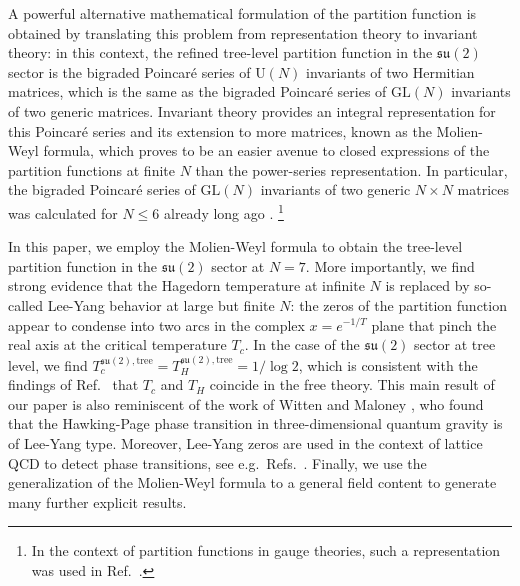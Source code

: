 \documentclass[a4paper,11pt]{article}
\begin{document}
A powerful alternative mathematical formulation of the partition function is obtained by translating this problem from representation theory to invariant theory: in this context, the refined tree-level partition function in the $\mathfrak{su}(2)$ sector is the bigraded Poincar\'e series of $\text{U}(N)$ invariants of two Hermitian matrices, which is the same as the bigraded Poincar\'e series of $\text{GL}(N)$ invariants of two generic matrices.
% 
Invariant theory provides an integral representation for this Poincar\'e series and its extension to more matrices, known as the Molien-Weyl formula, which proves to be an easier avenue to closed expressions of the partition functions at finite $N$ than the power-series representation.
In particular, the bigraded Poincar\'e series of $\text{GL}(N)$ invariants of two generic $N\times N$ matrices was calculated for $N\leq 6$ already long ago \cite{FORMANEK1981105,teranishi1986,teranishi1987,dhokovic2007}.%
\footnote{In the context of partition functions in gauge theories, such a representation was used in Ref.\ \cite{Dolan:2007rq}.}





In this paper, we employ the Molien-Weyl formula to obtain the tree-level partition function in the $\mathfrak{su}(2)$ sector at $N=7$.
More importantly, we find strong evidence that the Hagedorn temperature at infinite $N$ is replaced by so-called Lee-Yang behavior \cite{Yang:1952be} at large but finite $N$: the zeros of the partition function appear to condense into two arcs in the complex $x=e^{-1/T}$ plane that pinch the real axis at the critical temperature $T_c$. In the case of the $\mathfrak{su}(2)$ sector at tree level, we find $T^{\mathfrak{su}(2),\text{tree}}_c= T^{\mathfrak{su}(2),\text{tree}}_H=1/\log2$, which is consistent with the findings of Ref.\ \cite{Aharony:2003sx} that $T_c$ and $T_H$ coincide in the free theory. 
This main result of our paper is also reminiscent of the work of Witten and Maloney \cite{Maloney:2007ud}, who found that the Hawking-Page phase transition in three-dimensional quantum gravity is of Lee-Yang type.
Moreover, Lee-Yang zeros are used in the context of lattice QCD to detect phase transitions, see e.g.\ Refs.\ \cite{Nagata:2012tc,Nakamura:2013ska,Nagata:2014fra,Wakayama:2018wkc,Wakayama:2019hgz}.
Finally, we use the generalization of the Molien-Weyl formula to a general field content \cite{Dolan:2007rq} to generate many further explicit results.
\end{document}
